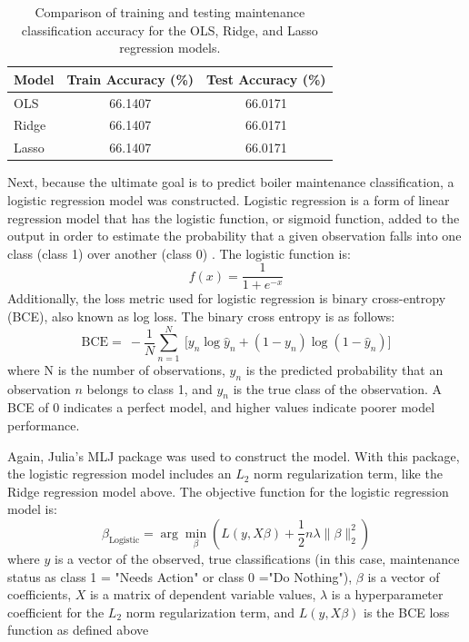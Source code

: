 \documentclass[NewProceedings,letterpaper,NoPageNumbers,NoLineNumbers, DoubleSpace]{ascelike-new}
\begin{document}
\begin{table}[htbp] 
\centering 
\begin{tabular}{lcc} 
\toprule Model & Train Accuracy (\%) & Test Accuracy (\%) \\ 
\midrule 
OLS & 66.1407 & 66.0171 \\ 
Ridge & 66.1407 & 66.0171 \\ 
Lasso & 66.1407 & 66.0171 \\ 
\bottomrule 
\end{tabular} \caption{Comparison of training and testing maintenance classification accuracy for the OLS, Ridge, and Lasso regression models.} 
\label{tab:reg_model_accuracy} 
\end{table}


Next, because the ultimate goal is to predict boiler maintenance classification, a logistic regression model was constructed. Logistic regression is a form of linear regression model that has the logistic function, or sigmoid function, added to the output in order to estimate the probability that a given observation falls into one class (class 1) over another (class 0) \cite{brunton2022data}. The logistic function is:
\[
f(x) = \frac{1}{1 + e^{-x}}
\]
Additionally, the loss metric used for logistic regression is binary cross-entropy (BCE), also known as log loss. The binary cross entropy is as follows:
\[
\mathrm{BCE} =\ -\frac1N\sum_{n=1}^N\ \bigg[y_n  \log \hat y_n + (1 - y_n)  \log (1 - \hat y_n)\bigg]
\]
where N is the number of observations, $\hat y_n$ is the predicted probability that an observation $n$ belongs to class 1, and $y_n$ is the true class of the observation. A BCE of 0 indicates a perfect model, and higher values indicate poorer model performance. 

Again, Julia's MLJ package was used to construct the model. With this package, the logistic regression model includes an $L_2$ norm regularization term, like the Ridge regression model above. The objective function for the logistic regression model is:
\[
\beta_{\text{Logistic}} = \arg\min_{\beta} \left( L(y, X\beta) + \frac{1}{2} n \lambda \|\beta\|_2^2 \right)
\]
where $y$ is a vector of the observed, true classifications (in this case, maintenance status as class 1 = "Needs Action" or class 0 ="Do Nothing"), $\beta$ is a vector of coefficients, $X$ is a matrix of dependent variable values, $\lambda$ is a hyperparameter coefficient for the $L_2$ norm regularization term, and $L(y, X\beta)$ is the BCE loss function as defined above \cite{mlj_linear_models}
\end{document}
